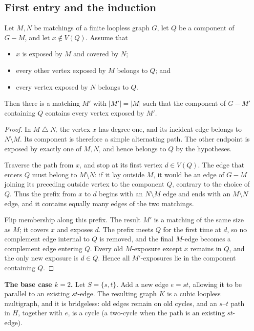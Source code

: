 \documentclass[a4paper,11pt]{article}
\newcommand{\abs}[1]{\left\lvert#1\right\rvert}
\newcommand{\symdiff}{\mathbin{\triangle}}    %
\numberwithin{equation}{section}
\begin{document}
\subsection{First entry and the induction}\label{sec:first-entry}

\begin{lemma}\label{lem:first-entry}
  Let $M,N$ be matchings of a finite loopless graph $G$, let $Q$ be a component
  of $G-M$, and let $x\notin V(Q)$. Assume that
  \begin{itemize}
    \item $x$ is exposed by $M$ and covered by $N$;
    \item every other vertex exposed by $M$ belongs to $Q$; and
    \item every vertex exposed by $N$ belongs to $Q$.
  \end{itemize}
  Then there is a matching $M'$ with $\abs{M'}=\abs{M}$ such that the component
  of $G-M'$ containing $Q$ contains every vertex exposed by $M'$.
\end{lemma}

\begin{proof}
  In $M\symdiff N$, the vertex $x$ has degree one, and its incident edge belongs
  to $N\setminus M$. Its component is therefore a simple alternating path. The
  other endpoint is exposed by exactly one of $M,N$, and hence belongs to $Q$ by
  the hypotheses.

  Traverse the path from $x$, and stop at its first vertex $d\in V(Q)$. The edge
  that enters $Q$ must belong to $M\setminus N$: if it lay outside $M$, it would
  be an edge of $G-M$ joining its preceding outside vertex to the component $Q$,
  contrary to the choice of $Q$. Thus the prefix from $x$ to $d$ begins with an
  $N\setminus M$ edge and ends with an $M\setminus N$ edge, and it contains
  equally many edges of the two matchings.

  Flip membership along this prefix. The result $M'$ is a matching of the same
  size as $M$; it covers $x$ and exposes $d$. The prefix meets $Q$ for the first
  time at $d$, so no complement edge internal to $Q$ is removed, and the final
  $M$-edge becomes a complement edge entering $Q$. Every old $M$-exposure except
  $x$ remains in $Q$, and the only new exposure is $d\in Q$. Hence all
  $M'$-exposures lie in the component containing $Q$.
\end{proof}

\medskip\noindent\textbf{The base case $k=2$.}
Let $S=\{s,t\}$. Add a new edge $e=st$, allowing it to be parallel to an
existing $st$-edge. The resulting graph $K$ is a cubic loopless multigraph, and
it is bridgeless: old edges remain on old cycles, and an $s$--$t$ path in $H$,
together with $e$, is a cycle (a two-cycle when the path is an existing
$st$-edge).
\end{document}
